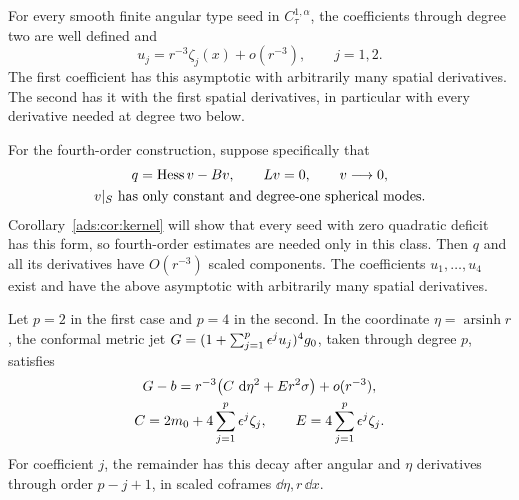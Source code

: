 \begin{lemma}
\label{ads:ana:coefficients}
For every smooth finite angular type seed in $C^{1,\alpha}_\tau$,
the coefficients through degree two are well defined and
\[
  u_j=r^{-3}\zeta_j(x)+o(r^{-3}),\qquad j=1,2.
\]
The first coefficient has this asymptotic with arbitrarily many
spatial derivatives.  The second has it with the first spatial
derivatives, in particular with every derivative needed at degree
two below.

For the fourth-order construction, suppose specifically that
\begin{equation}
 \begin{gathered}
 q=\operatorname{Hess} v-Bv,\qquad Lv=0,\qquad v\longrightarrow0,\\
 v|_S\text{ has only constant and degree-one spherical modes}.
 \end{gathered}
 \label{ads:ana:kernel-seed}
\end{equation}
Corollary~\ref{ads:cor:kernel} will show that every seed with zero quadratic
deficit has this form, so fourth-order estimates are needed only in
this class. Then $q$ and all its derivatives have $O(r^{-3})$ scaled
components.
The coefficients $u_1,\ldots,u_4$ exist and have the above asymptotic
with arbitrarily many spatial derivatives.

Let $p=2$ in the first case and $p=4$ in the second.  In the coordinate
$\eta=\operatorname{arsinh}r$, the conformal metric jet
$G=(1+\sum_{j=1}^p\epsilon^ju_j)^4g_0$, taken through degree $p$, satisfies
\begin{equation}
 \begin{gathered}
 G-b=r^{-3}\bigl(C\,\,\mathrm d\eta^2+E r^2\sigma\bigr)+o(r^{-3}),\\
 C=2m_0+4\sum_{j=1}^p\epsilon^j\zeta_j,\qquad
 E=4\sum_{j=1}^p\epsilon^j\zeta_j.
 \end{gathered}
 \label{ads:ana:metric-asymptotic}
\end{equation}
For coefficient $j$, the remainder has this decay after angular and
$\eta$ derivatives through order $p-j+1$, in scaled coframes
$\dd\eta,r\,\dd x$.
\end{lemma}

